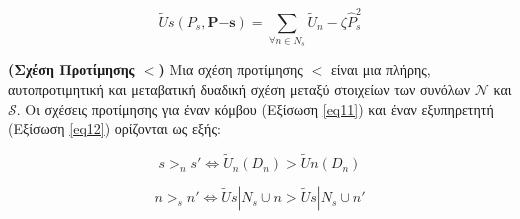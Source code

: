 \begin{equation}
\widetilde{U}s(P_s, \mathbf{P{-s}}) = \sum\limits_{\forall n\in N_s} \widetilde{U}_n - \zeta \hat{P}_s^2
\label{eq10}
\end{equation}

\vspace{-5pt}

\noindent
\begin{definition} \label{Definition 2} \textbf{(Σχέση Προτίμησης $<$)} Μια σχέση προτίμησης $<$ είναι μια πλήρης, αυτοπροτιμητική και μεταβατική δυαδική σχέση μεταξύ στοιχείων των συνόλων $\mathcal{N}$ και $\mathcal{S}$. Οι σχέσεις προτίμησης για έναν κόμβου (Εξίσωση \ref{eq11}) και έναν εξυπηρετητή (Εξίσωση \ref{eq12}) ορίζονται ως εξής:

\vspace{-5pt}

\begin{equation}
s >_n s' \Longleftrightarrow \widetilde{U}_n(D_n) > \widetilde{U}n(D_n)
\label{eq11}
\end{equation}

\vspace{-5pt}

\begin{equation}
n >_s n' \Longleftrightarrow \widetilde{U}s|{N_s \cup {n}} > \widetilde{U}s|{N_s \cup {n'}}
\label{eq12}
\end{equation}

\vspace{-8pt}

\end{definition}

